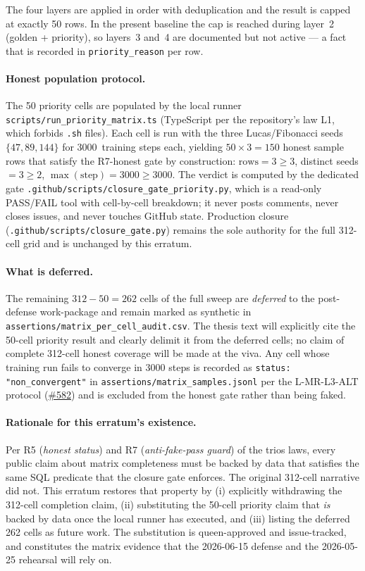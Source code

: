 The four layers are applied in order with deduplication and the
result is capped at exactly 50 rows. In the present baseline the
cap is reached during layer~2 (golden + priority), so layers~3
and~4 are documented but not active --- a fact that is recorded
in \texttt{priority\_reason} per row.

\paragraph{Honest population protocol.}
The 50 priority cells are populated by the local runner
\texttt{scripts/run\_priority\_matrix.ts} (TypeScript per the
repository's law L1, which forbids \texttt{.sh} files). Each
cell is run with the three Lucas/Fibonacci seeds
$\{47, 89, 144\}$ for $3000$~training steps each, yielding
$50 \times 3 = 150$ honest sample rows that satisfy the R7-honest
gate by construction:
$\text{rows} = 3 \geq 3$, distinct seeds $= 3 \geq 2$,
$\max(\text{step}) = 3000 \geq 3000$.
The verdict is computed by the dedicated gate
\texttt{.github/scripts/closure\_gate\_priority.py}, which is a
read-only PASS/FAIL tool with cell-by-cell breakdown; it never
posts comments, never closes issues, and never touches GitHub
state. Production closure
(\texttt{.github/scripts/closure\_gate.py}) remains the sole
authority for the full 312-cell grid and is unchanged by this
erratum.

\paragraph{What is deferred.}
The remaining $312 - 50 = 262$ cells of the full sweep are
\emph{deferred} to the post-defense work-package and remain marked
as synthetic in
\texttt{assertions/matrix\_per\_cell\_audit.csv}. The thesis text
will explicitly cite the 50-cell priority result and clearly
delimit it from the deferred cells; no claim of complete
312-cell honest coverage will be made at the viva. Any cell whose
training run fails to converge in $3000$ steps is recorded as
\texttt{status: "non\_convergent"} in
\texttt{assertions/matrix\_samples.jsonl} per the L-MR-L3-ALT
protocol (\href{https://github.com/gHashTag/trios/issues/582}{\#582})
and is excluded from the honest gate rather than being faked.

\paragraph{Rationale for this erratum's existence.}
Per R5 (\emph{honest status}) and R7 (\emph{anti-fake-pass guard})
of the trios laws, every public claim about matrix completeness
must be backed by data that satisfies the same SQL predicate that
the closure gate enforces. The original 312-cell narrative did
not. This erratum restores that property by (i) explicitly
withdrawing the 312-cell completion claim, (ii) substituting the
50-cell priority claim that \emph{is} backed by data once the
local runner has executed, and (iii) listing the deferred 262
cells as future work. The substitution is queen-approved and
issue-tracked, and constitutes the matrix evidence that the
2026-06-15 defense and the 2026-05-25 rehearsal will rely on.

